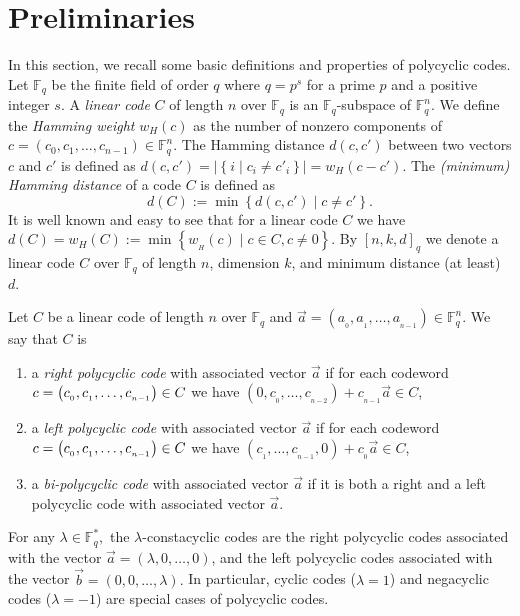 \documentclass[12pt]{elsarticle}
\newcommand{\Fq}{\mathbb{F}_{q}}
\theoremstyle{break}
{\theorembodyfont{\upshape}
    \newtheorem{theorem}{Theorem}[section] %
    \newtheorem{lemma}[theorem]{Lemma} %
    \newtheorem{proposition}[theorem]{Proposition}
    \newtheorem{corollary}[theorem]{Corollary}
    \newtheorem{definition}[theorem]{Definition}
    \newtheorem{example}[theorem]{Example}
    \newtheorem{remark}[theorem]{Remark}
    \newtheorem{conjecture}[theorem]{Conjecture}
    \newtheorem*{proof}{{Proof}}
	\newtheorem*{notation}{Notation}
	\newtheorem*{main}{Cain Theorem}
	\newtheorem*{problem}{Problem}
}
\begin{document}
\section{Preliminaries}\label{sec:prelim}
In this section, we recall some basic definitions and properties of polycyclic codes.  Let $\mathbb{F}_q$ be the finite field of order $q$ where $q=p^s$  for a prime $p$ and a positive integer $s$. A \textit{linear code} $C$ of length $n$ over $\Fq$ is an $\Fq$-subspace of $\Fq^{n}$.   We define the \textit{Hamming weight} $w_H(c)$ 
as the number of nonzero components of $ c=(c_0,c_1,\ldots,c_{n-1})\in \Fq^{n}$. The Hamming distance $d(c,c')$ between two vectors $c$ and $c'$ is defined as $d(c, c')=\left|\left\{i \mid c_i \neq c'_i\right\}\right| = w_H(c-c')$. 
The \textit{(minimum) Hamming distance} of a code $C$ is defined as
$$ d(C):=\min \left\{d(c, c') \mid c \neq c'\right\}.$$ 
It is well known and easy to see that for a linear code $C$ we have $d(C)=w_H(C):=\min \left\{w_{_H}(c) \mid c \in C, c \neq 0\right\}$.  By $[n,k,d]_q$ we denote  a linear code $C$ over $\Fq$ of length $n$, dimension $k$, and minimum distance (at least) $d$. 
	\begin{definition}  \label{D1}	
		Let   $ C $  be a linear code  of length $n$ over $\Fq$ and  $\vec{a}=\left(a_{_0},a_{_1},\ldots, a_{_{n-1}}\right)\in \Fq^{n}$. We say that $C$ is	
		\begin{enumerate}	
			\item  a \textit{right polycyclic code} with associated vector  $\vec{a} $ if for each  codeword	$\\ c=\left(c_{_0},c_{_1},\ldots, c_{_{n-1}}\right)\in C $ we have $ \left(0,c_{_0},\ldots, c_{_{n-2}}\right)+c_{_{n-1}} \vec{a} \in C$,
			\item  a \textit{left   polycyclic code} with associated vector  $\vec{a} $  if for each  codeword $\\ c=\left(c_{_0},c_{_1},\ldots, c_{_{n-1}}\right)\in C$ we have $ \left(c_{_1},\ldots, c_{_{n-1}},0\right)+c_{_{0}} \vec{a} \in C$,
   \item  a \textit{bi-polycyclic code} with associated vector  $\vec{a} $ if it is both a right and a left polycyclic code with associated vector  $\vec{a}. $ 
		\end{enumerate}			
	\end{definition} 
\begin{remark}\label{R1}
		For any $\lambda \in \Fq^*,$ the $\lambda$-constacyclic codes are the right polycyclic codes associated with the vector $\vec{a}=\left(\lambda,0,\ldots, 0\right)$, and the left polycyclic codes associated with the vector $\vec{b}=\left(0,0,\ldots, \lambda\right). $ In particular,     cyclic codes ($ \lambda=1 $) and  negacyclic codes  ($ \lambda=-1 $) are special cases of polycyclic codes.\end{remark}
\end{document}
